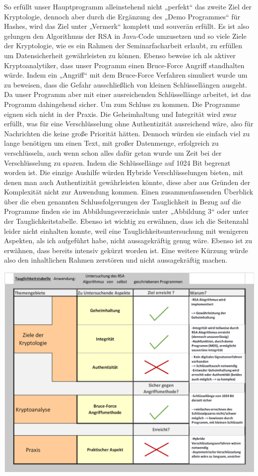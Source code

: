So erfüllt unser Hauptprogramm alleinstehend nicht „perfekt“ das zweite Ziel der Kryptologie, dennoch aber durch die Ergänzung des „Demo Programmes“ für Hashes, wird das Ziel unter „Vermerk“ komplett und souverän erfüllt. Es ist also gelungen den Algorithmus der RSA in Java-Code umzusetzen und so viele Ziele der Kryptologie, wie es ein Rahmen der Seminarfacharbeit erlaubt, zu erfüllen um Datensicherheit gewährleisten zu können. Ebenso beweise ich als aktiver Kryptoanalytiker, dass unser Programm einen Bruce-Force Angriff standhalten würde. Indem ein „Angriff“ mit dem Bruce-Force Verfahren simuliert wurde um zu beweisen, dass die Gefahr ausschließlich von kleinen Schlüssellängen ausgeht. Da unser Programm aber mit einer ausreichenden Schlüssellänge arbeitet, ist das Programm dahingehend sicher. Um zum Schluss zu kommen. Die Programme eignen sich nicht in der Praxis. Die Geheimhaltung und Integrität wird zwar erfüllt, was für eine Verschlüsselung ohne Authentizität ausreichend wäre, also für Nachrichten die keine große Priorität hätten. Dennoch würden sie einfach viel zu lange benötigen um einen Text, mit großer Datenmenge, erfolgreich zu verschlüsseln, auch wenn schon alles dafür getan wurde um Zeit bei der Verschlüsselung zu sparen. Indem die Schlüssellänge auf 1024 Bit begrenzt worden ist. Die einzige Aushilfe würden Hybride Verschlüsselungen bieten, mit denen man auch Authentizität gewährleisten könnte, diese aber aus Gründen der Komplexität nicht zur Anwendung kommen. Einen zusammenfassenden Überblick über die eben genannten Schlussfolgerungen der Tauglichkeit in Bezug auf die Programme finden sie im Abbildungsverzeichnis unter „Abbildung 3“ oder unter der Tauglichkeitstabelle. Ebenso ist wichtig zu erwähnen, dass ich die Seitenzahl leider nicht einhalten konnte, weil eine Tauglichkeitsuntersuchung mit wenigeren Aspekten, als ich aufgeführt habe, nicht aussagekräftig genug wäre. Ebenso ist zu erwähnen, dass bereits intensiv gekürzt worden ist. Eine weitere Kürzung würde also den inhaltlichen Rahmen zerstören und nicht aussagekräftig machen.

\begin{center}
	\includegraphics[width=1\textwidth]{./img/tauglichkeit}
\end{center}